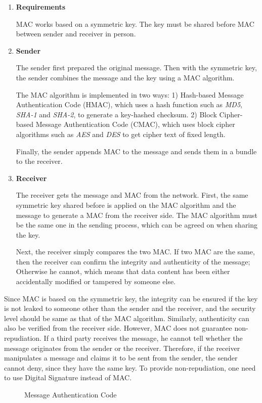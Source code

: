 	\begin{enumerate}
		\item
			\textbf{Requirements}

			MAC works based on a symmetric key. The key must be shared before MAC between sender and receiver in person.
		\item
			\textbf{Sender}

			The sender first prepared the original message. Then with the symmetric key, the sender combines the message and the key using a MAC algorithm.

			The MAC algorithm is implemented in two ways: 1) Hash-based Message Authentication Code (HMAC), which uses a hash function such as \emph{MD5}, \emph{SHA-1} and \emph{SHA-2}, to generate a key-hashed checksum. 2) Block Cipher-based Message Authentication Code (CMAC), which uses block cipher algorithms such as \emph{AES} and \emph{DES} to get cipher text of fixed length.

			Finally, the sender appends MAC to the message and sends them in a bundle to the receiver.
		\item
			\textbf{Receiver}

			The receiver gets the message and MAC from the network. First, the same symmetric key shared before is applied on the MAC algorithm and the message to generate a MAC from the receiver side. The MAC algorithm must be the same one in the sending process, which can be agreed on when sharing the key.

			Next, the receiver simply compares the two MAC. If two MAC are the same, then the receiver can confirm the integrity and authenticity of the message; Otherwise he cannot, which means that data content has been either accidentally modified or tampered by someone else.
	\end{enumerate}

	Since MAC is based on the symmetric key, the integrity can be ensured if the key is not leaked to someone other than the sender and the receiver, and the security level should be same as that of the MAC algorithm. Similarly, authenticity can also be verified from the receiver side. However, MAC does not guarantee non-repudiation. If a third party receives the message, he cannot tell whether the message originates from the sender or the receiver. Therefore, if the receiver manipulates a message and claims it to be sent from the sender, the sender cannot deny, since they have the same key. To provide non-repudiation, one need to use Digital Signature \cite{dig-sig} instead of MAC.
	\begin{figure}[H]
		\centering
		
		\caption{Message Authentication Code}\label{fig:mac}
	\end{figure}